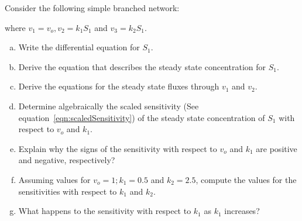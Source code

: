 \documentclass[12pt]{article}
\begin{document}
\begin{question}
Consider the following simple branched network:

\begin{center}
\end{center}

where $v_1 = v_o, v_2 = k_1 S_1$ and $v_3 = k_2 S_1$.
\begin{enumerate}[a)]
\item Write the differential equation for $S_1$.
\item Derive the equation that describes the steady state concentration for $S_1$.
\item Derive the equations for the steady state fluxes through $v_1$ and $v_2$.
\item Determine algebraically the scaled sensitivity (See equation~\ref{eqn:scaledSensitivity}) of the steady state concentration of $S_1$ with respect to $v_o$ and $k_1$.
\item Explain why the signs of the sensitivity with respect to $v_o$ and $k_1$ are positive and negative, respectively?
\item Assuming values for $v_o = 1; k_1 = 0.5$ and $k_2 = 2.5$, compute the values for the sensitivities with respect to $k_1$ and $k_2$.
\item What happens to the sensitivity with respect to $k_1$ as $k_1$ increases?
\end{enumerate}

\end{question}
\end{document}

